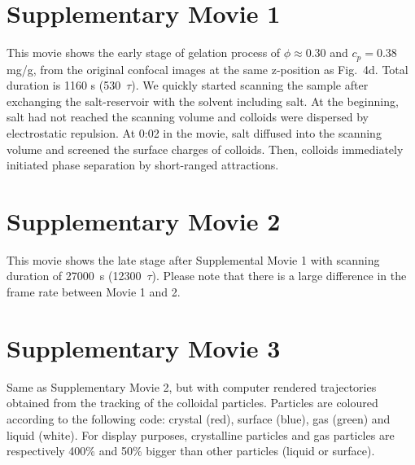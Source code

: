 


\clearpage

\section*{Supplementary Movie 1}
This movie shows the early stage of gelation process of $\phi\approx 0.30$ and $c_p=0.38$ mg/g, from the original confocal images at the same z-position as Fig.~4d. Total duration is 1160 s (530~$\tau$). We quickly started scanning the sample after exchanging the salt-reservoir with the solvent including salt. At the beginning, salt had not reached the scanning volume and colloids were dispersed by electrostatic repulsion. At 0:02 in the movie, salt diffused into the scanning volume and screened the surface charges of colloids. Then, colloids immediately initiated phase separation by short-ranged attractions.

\section*{Supplementary Movie 2}
This movie shows the late stage after Supplemental Movie 1 with scanning duration of 27000~s (12300~$\tau$). Please note that there is a large difference in the frame rate between Movie 1 and 2. 

\section*{Supplementary Movie 3}
Same as Supplementary Movie 2, but with computer rendered trajectories obtained from the tracking of the colloidal particles. Particles are coloured according to the following code: crystal (red), surface (blue), gas (green) and liquid (white). For display purposes, crystalline particles and gas particles are respectively 400\% and 50\% bigger than other particles (liquid or surface).




